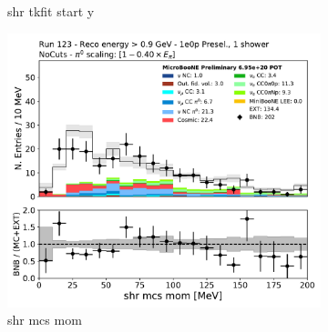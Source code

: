 \begin{figure}[H]
\begin{subfigure}{0.3\textwidth}
    \caption{shr tkfit start y}
    \end{subfigure}
    \begin{subfigure}{0.3\textwidth}
    \includegraphics[width=1.0\textwidth]{1e0p/High_E_Sideband/shrMCSMom.pdf}
    \caption{shr mcs mom}
    \end{subfigure}
    \caption{} 
    \label{fig:HE_1eNp_1}
\end{figure}


